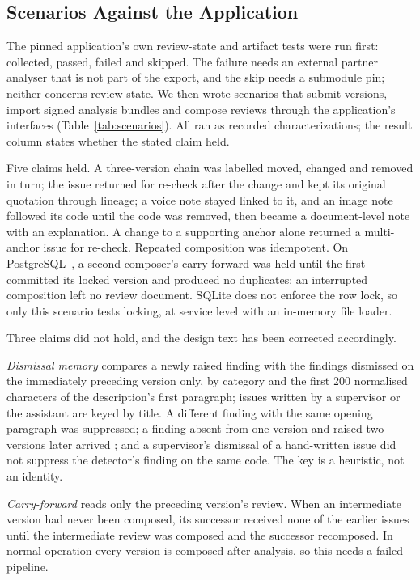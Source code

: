\subsection{Scenarios Against the Application}
The pinned application's own review-state and artifact tests were run first: \wpdAppTestsCollected{} collected, \wpdAppTestsPassed{} passed, \wpdAppTestsFailed{} failed and \wpdAppTestsSkipped{} skipped. The failure needs an external partner analyser that is not part of the export, and the skip needs a submodule pin; neither concerns review state. We then wrote \wpdScenarioRun{} scenarios that submit versions, import signed analysis bundles and compose reviews through the application's interfaces (Table~\ref{tab:scenarios}). All \wpdScenarioPassed{} ran as recorded characterizations; the result column states whether the stated claim held.



Five claims held. A three-version chain was labelled moved, changed and removed in turn; the issue returned for re-check after the change and kept its original quotation through lineage; a voice note stayed linked to it, and an image note followed its code until the code was removed, then became a document-level note with an explanation. A change to a supporting anchor alone returned a multi-anchor issue for re-check. Repeated composition was idempotent. On PostgreSQL~\wpdPgVersion{}, a second composer's carry-forward was held until the first committed its locked version and produced no duplicates; an interrupted composition left no review document. SQLite does not enforce the row lock, so only this scenario tests locking, at service level with an in-memory file loader.

Three claims did not hold, and the design text has been corrected accordingly.

\emph{Dismissal memory} compares a newly raised finding with the findings dismissed on the immediately preceding version only, by category and the first 200 normalised characters of the description's first paragraph; issues written by a supervisor or the assistant are keyed by title. A different finding with the same opening paragraph was suppressed; a finding absent from one version and raised two versions later arrived ; and a supervisor's dismissal of a hand-written issue did not suppress the detector's finding on the same code. The key is a heuristic, not an identity.

\emph{Carry-forward} reads only the preceding version's review. When an intermediate version had never been composed, its successor received none of the earlier issues until the intermediate review was composed and the successor recomposed. In normal operation every version is composed after analysis, so this needs a failed pipeline.

